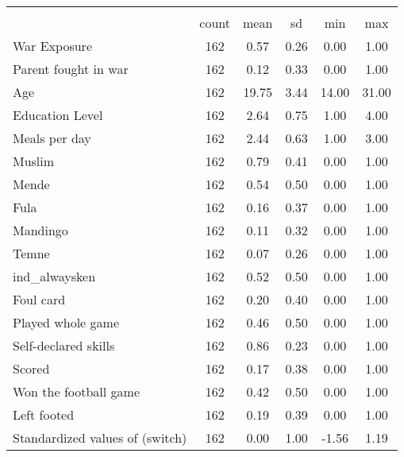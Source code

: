{
\def\sym#1{\ifmmode^{#1}\else\(^{#1}\)\fi}
\begin{tabular}{l*{1}{ccccc}}
\hline\hline
                    &\multicolumn{5}{c}{}                                            \\
                    &       count&        mean&          sd&         min&         max\\
\hline
War Exposure        &         162&        0.57&        0.26&        0.00&        1.00\\
Parent fought in war&         162&        0.12&        0.33&        0.00&        1.00\\
Age                 &         162&       19.75&        3.44&       14.00&       31.00\\
Education Level     &         162&        2.64&        0.75&        1.00&        4.00\\
Meals per day       &         162&        2.44&        0.63&        1.00&        3.00\\
Muslim              &         162&        0.79&        0.41&        0.00&        1.00\\
Mende               &         162&        0.54&        0.50&        0.00&        1.00\\
Fula                &         162&        0.16&        0.37&        0.00&        1.00\\
Mandingo            &         162&        0.11&        0.32&        0.00&        1.00\\
Temne               &         162&        0.07&        0.26&        0.00&        1.00\\
ind\_alwaysken       &         162&        0.52&        0.50&        0.00&        1.00\\
Foul card           &         162&        0.20&        0.40&        0.00&        1.00\\
Played whole game   &         162&        0.46&        0.50&        0.00&        1.00\\
Self-declared skills&         162&        0.86&        0.23&        0.00&        1.00\\
Scored              &         162&        0.17&        0.38&        0.00&        1.00\\
Won the football game&         162&        0.42&        0.50&        0.00&        1.00\\
Left footed         &         162&        0.19&        0.39&        0.00&        1.00\\
Standardized values of (switch)     &         162&        0.00&        1.00&       -1.56&        1.19\\

\end{tabular}}
